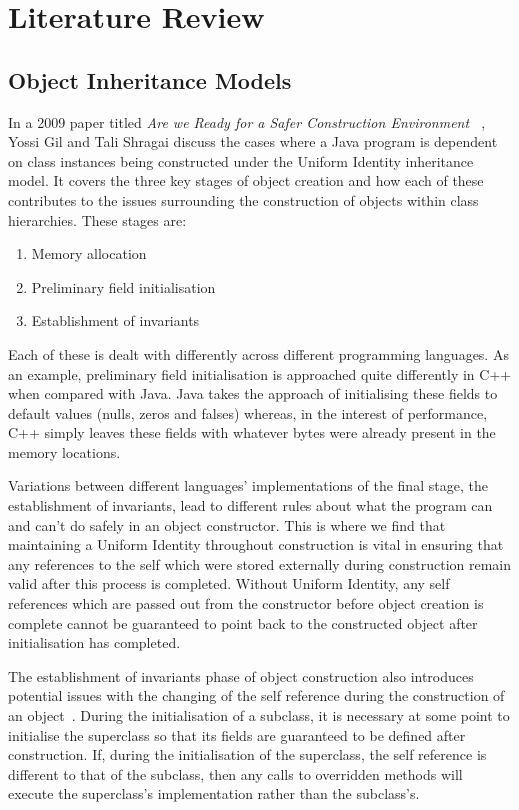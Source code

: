 \chapter{Literature Review}\label{C:us}
\section{Object Inheritance Models}
In a 2009 paper titled \textit{Are we Ready for a Safer Construction Environment ~\cite{SaferConstruction}}, Yossi Gil and Tali Shragai discuss the cases where a Java program is dependent on class instances being constructed under the Uniform Identity inheritance model. It covers the three key stages of object creation and how each of these contributes to the issues surrounding the construction of objects within class hierarchies. These stages are:
\begin{enumerate}
	\item Memory allocation
	\item Preliminary field initialisation
	\item Establishment of invariants
\end{enumerate}
Each of these is dealt with differently across different programming languages. As an example, preliminary field initialisation is approached quite differently in C++ when compared with Java. Java takes the approach of initialising these fields to default values (nulls, zeros and falses) whereas, in the interest of performance, C++ simply leaves these fields with whatever bytes were already present in the memory locations.

Variations between different languages’ implementations of the final stage, the establishment of invariants, lead to different rules about what the program can and can't do safely in an object constructor. This is where we find that maintaining a Uniform Identity throughout construction is vital in ensuring that any references to the self which were stored externally during construction remain valid after this process is completed. Without Uniform Identity, any self references which are passed out from the constructor before object creation is complete cannot be guaranteed to point back to the constructed object after initialisation has completed.
\newline

The establishment of invariants phase of object construction also introduces potential issues with the changing of the self reference during the construction of an object~\cite{SaferConstruction}. During the initialisation of a subclass, it is necessary at some point to initialise the superclass so that its fields are guaranteed to be defined after construction. If, during the initialisation of the superclass, the self reference is different to that of the subclass, then any calls to overridden methods will execute the superclass's implementation rather than the subclass's.


